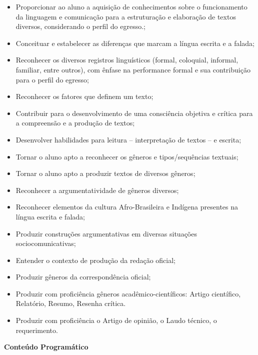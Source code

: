 \begin{itemize}

\item Proporcionar ao aluno a aquisição de conhecimentos sobre o funcionamento da linguagem e comunicação para a estruturação e elaboração de textos diversos, considerando o perfil do egresso.;
\item Conceituar e estabelecer as diferenças que marcam a língua escrita e a falada;
\item Reconhecer os diversos registros linguísticos (formal, coloquial, informal, familiar, entre outros), com ênfase na performance formal e sua contribuição para o perfil do egresso;
\item Reconhecer os fatores que definem um texto;
\item Contribuir para o desenvolvimento de uma consciência objetiva e crítica para a compreensão e a produção de textos;
\item Desenvolver habilidades para leitura – interpretação de textos – e escrita;
\item Tornar o aluno apto a reconhecer os gêneros e tipos/sequências textuais;
\item Tornar o aluno apto a produzir textos de diversos gêneros;
\item Reconhecer a argumentatividade de gêneros diversos;
\item Reconhecer elementos da cultura Afro-Brasileira e Indígena presentes na língua escrita e falada;
\item Produzir construções argumentativas em diversas situações sociocomunicativas;
\item Entender o contexto de produção da redação oficial;
\item Produzir gêneros da correspondência oficial;
\item Produzir com proficiência gêneros acadêmico-científicos: Artigo científico, Relatório, Resumo, Resenha crítica.
\item Produzir com proficiência o Artigo de opinião, o Laudo técnico, o requerimento.

\end{itemize} 


\begin{snugshade}\begin{center}\textbf{
    Conteúdo Programático
}\end{center}\end{snugshade}

